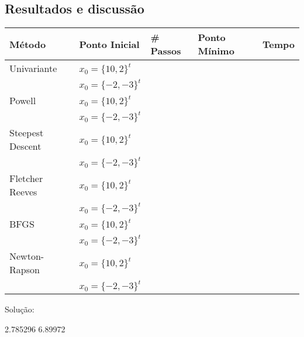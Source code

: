\documentclass[12pt]{article}
\begin{document}
\subsection*{Resultados e discussão}

\begin{table}[H]
  \centering
  \renewcommand{\arraystretch}{1.4}
  \begin{tabular}{lllll}
    \hline
    \textbf{Método} & \textbf{Ponto Inicial} & \textbf{\# Passos} & \textbf{Ponto Mínimo} & \textbf{Tempo} \\\hline
    Univariante & $x_{0} =\{10,2\}^{t}$ & & & \\
     & $x_{0}=\{-2,-3\}^{t}$ & & & \\\hline 
    Powell & $x_{0} =\{10,2\}^{t}$ & & & \\
     & $x_{0}=\{-2,-3\}^{t}$ & & & \\\hline 
    Steepest Descent & $x_{0} =\{10,2\}^{t}$ & & & \\
     & $x_{0}=\{-2,-3\}^{t}$ & & & \\\hline 
    Fletcher Reeves & $x_{0} =\{10,2\}^{t}$ & & & \\
     & $x_{0}=\{-2,-3\}^{t}$ & & & \\\hline 
    BFGS & $x_{0} =\{10,2\}^{t}$ & & & \\
     & $x_{0}=\{-2,-3\}^{t}$ & & & \\\hline 
    Newton-Rapson & $x_{0} =\{10,2\}^{t}$ & & & \\
     & $x_{0}=\{-2,-3\}^{t}$ & & & \\\hline 
  \end{tabular}
\end{table}

Solução: 

2.785296
6.89972
\end{document}
